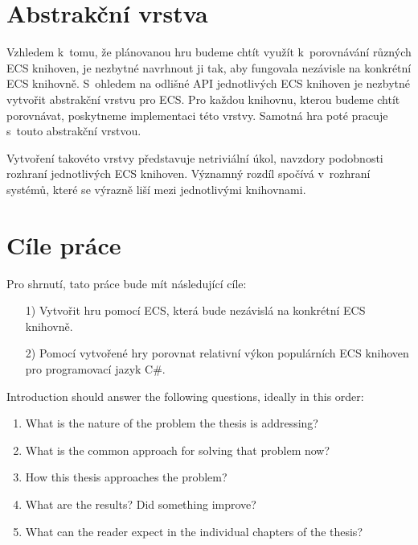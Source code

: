 
\section{Abstrakční vrstva}
\label{sec:abstract-layer-intro}
Vzhledem k~tomu, že plánovanou hru budeme chtít využít k~porovnávání různých ECS knihoven, je nezbytné navrhnout ji tak, aby fungovala nezávisle na konkrétní ECS knihovně. S~ohledem na odlišné API jednotlivých ECS knihoven je nezbytné vytvořit abstrakční vrstvu pro ECS. Pro každou knihovnu, kterou budeme chtít porovnávat, poskytneme implementaci této vrstvy. Samotná hra poté pracuje s~touto abstrakční vrstvou.

Vytvoření takovéto vrstvy představuje netriviální úkol, navzdory podobnosti rozhraní jednotlivých ECS knihoven. Významný rozdíl spočívá v~rozhraní systémů, které se výrazně liší mezi jednotlivými knihovnami.

\section{Cíle práce}
Pro shrnutí, tato práce bude mít následující cíle:
\begin{enumerate}
    \item[1)] Vytvořit hru pomocí ECS, která bude nezávislá na konkrétní ECS knihovně.
    \item[2)] Pomocí vytvořené hry porovnat relativní výkon populárních ECS knihoven pro programovací jazyk C\#.
\end{enumerate}














\iffalse
{}

Introduction should answer the following questions, ideally in this order:
\begin{enumerate}
\item What is the nature of the problem the thesis is addressing?
\item What is the common approach for solving that problem now?
\item How this thesis approaches the problem?
\item What are the results? Did something improve?
\item What can the reader expect in the individual chapters of the thesis?
\end{enumerate}

